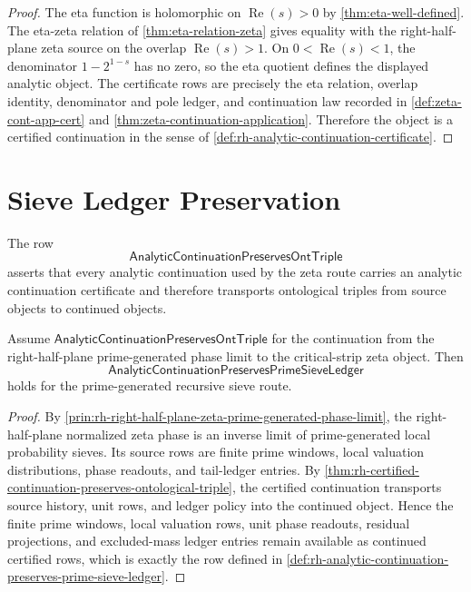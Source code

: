 \begin{proof}
The eta function is holomorphic on $\operatorname{Re}(s)>0$ by
\autoref{thm:eta-well-defined}.  The eta-zeta relation of
\autoref{thm:eta-relation-zeta} gives equality with the right-half-plane
zeta source on the overlap $\operatorname{Re}(s)>1$.  On
$0<\operatorname{Re}(s)<1$, the denominator $1-2^{1-s}$ has no zero, so
the eta quotient defines the displayed analytic object.  The certificate
rows are precisely the eta relation, overlap identity, denominator and
pole ledger, and continuation law recorded in
\autoref{def:zeta-cont-app-cert} and
\autoref{thm:zeta-continuation-application}.  Therefore the object is a
certified continuation in the sense of
\autoref{def:rh-analytic-continuation-certificate}.
\end{proof}

\section{Sieve Ledger Preservation}
\label{sec:rh-analytic-continuation-sieve-ledger-preservation}

\begin{definition}[AnalyticContinuationPreservesOntTriple]
\label{def:rh-analytic-continuation-preserves-ont-triple}
The row
$$
\mathsf{AnalyticContinuationPreservesOntTriple}
$$
asserts that every analytic continuation used by the zeta route carries
an analytic continuation certificate and therefore transports
ontological triples from source objects to continued objects.
\end{definition}

\begin{theorem}
\label{thm:rh-ontological-continuation-preserves-prime-sieve-ledger}
Assume $\mathsf{AnalyticContinuationPreservesOntTriple}$ for the
continuation from the right-half-plane prime-generated phase limit to
the critical-strip zeta object.  Then
$$
\mathsf{AnalyticContinuationPreservesPrimeSieveLedger}
$$
holds for the prime-generated recursive sieve route.
\end{theorem}

\begin{proof}
By
\autoref{prin:rh-right-half-plane-zeta-prime-generated-phase-limit}, the
right-half-plane normalized zeta phase is an inverse limit of
prime-generated local probability sieves.  Its source rows are finite
prime windows, local valuation distributions, phase readouts, and
tail-ledger entries.  By
\autoref{thm:rh-certified-continuation-preserves-ontological-triple},
the certified continuation transports source history, unit rows, and
ledger policy into the continued object.  Hence the finite prime
windows, local valuation rows, unit phase readouts, residual
projections, and excluded-mass ledger entries remain available as
continued certified rows, which is exactly the row defined in
\autoref{def:rh-analytic-continuation-preserves-prime-sieve-ledger}.
\end{proof}

